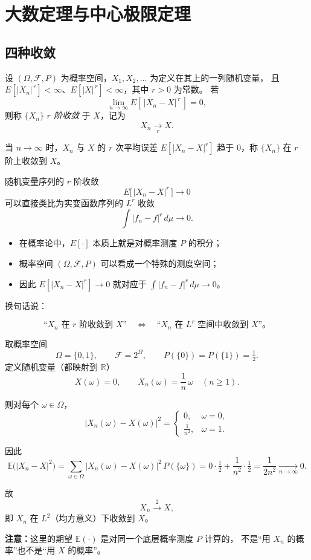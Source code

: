 \chapter{大数定理与中心极限定理}
\section{四种收敛}
\begin{definition}
设 $(\Omega,\mathcal{F},P)$ 为概率空间，$X_1,X_2,\dots$ 为定义在其上的一列随机变量，
且 $E\!\left[|X_n|^{\,r}\right]<\infty$、$E\!\left[|X|^{\,r}\right]<\infty$，其中 $r>0$ 为常数。
若
\[
\lim_{n\to\infty} E\!\left[\,|X_n - X|^{\,r}\,\right]=0,
\]
则称 $\{X_n\}$ \emph{$r$ 阶收敛} 于 $X$，记为
\[
X_n \xrightarrow[r]{} X.
\]
\end{definition}
\begin{note}
    当 $n\to\infty$ 时，$X_n$ 与 $X$ 的 $r$ 次平均误差 $E[|X_n-X|^{r}]$ 趋于 0，称 $\{X_n\}$ 在 $r$ 阶上收敛到 $X$。
\end{note}
\begin{note}[r 阶收敛与实变函数收敛的类比]

随机变量序列的 $r$ 阶收敛
\[
E\bigl[\,|X_n - X|^{r}\,\bigr] \to 0
\]
可以直接类比为实变函数序列的 $L^{r}$ 收敛
\[
\int |f_n - f|^{r}\, d\mu \to 0.
\]

\begin{itemize}
  \item 在概率论中，$E[\cdot]$ 本质上就是对概率测度 $P$ 的积分；
  \item 概率空间 $(\Omega,\mathcal F,P)$ 可以看成一个特殊的测度空间；
  \item 因此 $E[|X_n - X|^{r}] \to 0$ 就对应于
        $\displaystyle \int |f_n - f|^{r}\, d\mu \to 0$。
\end{itemize}

换句话说：

\[
\text{“$X_n$ 在 $r$ 阶收敛到 $X$”} 
\quad\Longleftrightarrow\quad
\text{“$X_n$ 在 $L^{r}$ 空间中收敛到 $X$”。}
\]

\end{note}
\begin{example}[一个最具体的 $r$ 阶收敛例子：取 $r=2$（均方收敛）]
取概率空间
\[
\Omega=\{0,1\},\qquad 
\mathcal F=2^\Omega,\qquad
P(\{0\})=P(\{1\})=\tfrac12.
\]
定义随机变量（都映射到 $\mathbb R$）
\[
X(\omega)=0,\qquad
X_n(\omega)=\frac{1}{n}\,\omega \quad (n\ge1).
\]

则对每个 $\omega\in\Omega$，
\[
|X_n(\omega)-X(\omega)|^2=
\begin{cases}
0, & \omega=0,\\[4pt]
\frac{1}{n^2}, & \omega=1.
\end{cases}
\]

因此
\[
\mathbb E\bigl(|X_n-X|^2\bigr)
=
\sum_{\omega\in\Omega}|X_n(\omega)-X(\omega)|^2\,P(\{\omega\})
=
0\cdot\tfrac12+\frac{1}{n^2}\cdot\tfrac12
=
\frac{1}{2n^2}
\xrightarrow[n\to\infty]{}0.
\]

故
\[
X_n \xrightarrow{\,2\,} X,
\]
即 $X_n$ 在 $L^2$（均方意义）下收敛到 $X$。

\medskip
\noindent
\textbf{注意：}这里的期望 $\mathbb E(\cdot)$ 是对同一个底层概率测度 $P$ 计算的，
不是“用 $X_n$ 的概率”也不是“用 $X$ 的概率”。
\end{example}
